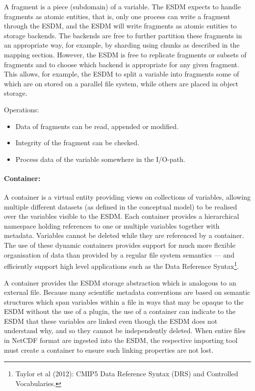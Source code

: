 A fragment is a piece (subdomain) of a variable.
The ESDM expects to handle fragments as atomic entities, that is, only one process can write a fragment through the ESDM, and the ESDM will write fragments as atomic entities to storage backends.
The backends are free to further partition these fragments in an appropriate way, for example, by sharding using chunks as described in the mapping section.
However, the ESDM is free to replicate fragments or subsets of fragments and to choose which backend is appropriate for any given fragment.
This allows, for example, the ESDM to split a variable into fragments some of which are on stored on a parallel file system, while others are placed in object storage.
 
Operations:

\begin{itemize}
  \item Data of fragments can be read, appended or modified.
  \item Integrity of the fragment can be checked.
  \item Process data of the variable somewhere in the I/O-path.
\end{itemize}

\paragraph{Container:}%
\label{container}

A container is a virtual entity providing views on collections of variables, allowing multiple different datasets (as defined in the conceptual model) to be realised over the variables visible to the ESDM.
Each container provides a hierarchical namespace holding references to one or multiple variables together with metadata.
Variables cannot be deleted while they are referenced by a container.
The use of these dynamic containers provides support for much more flexible organisation of data than provided by a regular file system semantics --- and efficiently support high level applications such as the Data Reference Syntax\footnote{Taylor et al (2012): CMIP5 Data Reference Syntax (DRS) and Controlled Vocabularies.}.
 
A container provides the ESDM storage abstraction which is analogous to an external file.
Because many scientific metadata conventions are based on semantic structures which span variables within a file in ways that may be opaque to the ESDM without the use of a plugin, the use of a container can indicate to the ESDM that these variables are linked even though the ESDM does not understand why, and so they cannot be independently deleted.
When entire files in NetCDF format are ingested into the ESDM, the respective importing tool must create a container to ensure such linking properties are not lost.
 
